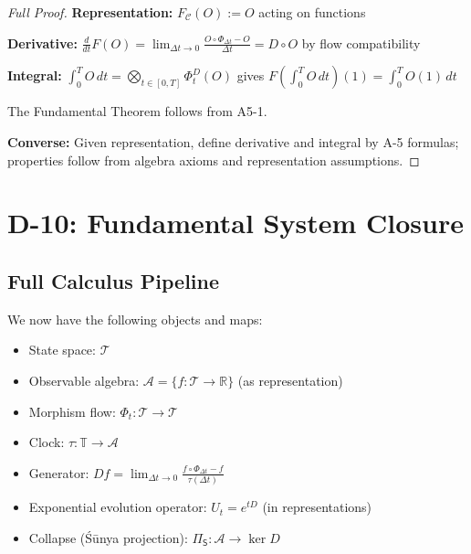 \documentclass[12pt, oneside]{article}
\DeclareMathOperator{\tr}{tr}
\newcommand{\A}{\mathcal{A}}
\newcommand{\T}{\mathcal{T}}
\newcommand{\Opr}{\mathcal{O}}
\newcommand{\wtilde}{\widetilde}
\begin{document}
\begin{proof}[Full Proof]
\textbf{Representation:} $F_{\mathcal{C}}(O) := O$ acting on functions

\textbf{Derivative:} $\frac{d}{dt}F(O) = \lim_{\Delta t \to 0} \frac{O \circ \Phi_{\Delta t} - O}{\Delta t} = D \circ O$ by flow compatibility

\textbf{Integral:} $\int_0^T O \, dt = \bigotimes_{t \in [0,T]} \Phi_t^D(O)$ gives $F(\int_0^T O \, dt)(1) = \int_0^T O(1) \, dt$

The Fundamental Theorem follows from A5-1.

\textbf{Converse:} Given representation, define derivative and integral by A-5 formulas; properties follow from algebra axioms and representation assumptions.
\end{proof}

\section{D-10: Fundamental System Closure}

\subsection{Full Calculus Pipeline}

We now have the following objects and maps:

\begin{center}
\end{center}

\begin{itemize}
    \item State space: $\T$
    \item Observable algebra: $\mathcal{A} = \{f: \T \rightarrow \mathbb{R}\}$ (as representation)
    \item Morphism flow: $\Phi_t: \T \rightarrow \T$
    \item Clock: $\tau: \mathbb{T} \rightarrow \A$
    \item Generator: $Df = \lim_{\Delta t \rightarrow 0} \frac{f \circ \Phi_{\Delta t} - f}{\tau(\Delta t)}$
    \item Exponential evolution operator: $U_t = e^{tD}$ (in representations)
    \item Collapse (Śūnya projection): $\Pi_{\mathsf{S}}: \mathcal{A} \rightarrow \ker D$
\end{itemize}
\end{document}
